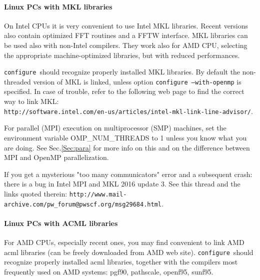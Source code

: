 \documentclass[12pt,a4paper]{article}
\def\configure{\texttt{configure}}
\begin{document}
\paragraph{Linux PCs with MKL libraries}
On Intel CPUs it is very convenient to use Intel MKL libraries.
Recent versions also contain optimized FFT routines and a FFTW
interface. MKL libraries can be used also with non-Intel compilers.
They work also for AMD CPU, selecting the appropriate machine-optimized
libraries, but with reduced performances.

\configure\ should recognize properly installed MKL libraries.
By default the non-threaded version of MKL is linked, unless option
\texttt{configure --with-openmp} is specified. In case of trouble,
refer to the following web page to find the correct way to link MKL:\\
\texttt{http://software.intel.com/en-us/articles/intel-mkl-link-line-advisor/}.

For parallel (MPI) execution on multiprocessor (SMP) machines, set the
environment variable OMP\_NUM\_THREADS to 1 unless you know what you
are doing. See Sec.\ref{Sec:para} for more info on this
and on the difference between MPI and OpenMP parallelization.

If you get a mysterious "too many communicators" error and a 
subsequent crash: there is a bug in Intel MPI and MKL 2016 update 3.
See this thread and the links quoted therein:
\verb|http://www.mail-archive.com/pw_forum@pwscf.org/msg29684.html|.

\paragraph{Linux PCs with ACML libraries}
For AMD CPUs, especially recent ones, you may find convenient to
link AMD acml libraries (can be freely downloaded from AMD web site).
\configure\ should recognize properly installed acml libraries,
together with the compilers most frequently used on AMD systems:
pgf90, pathscale, openf95, sunf95.
\end{document}
